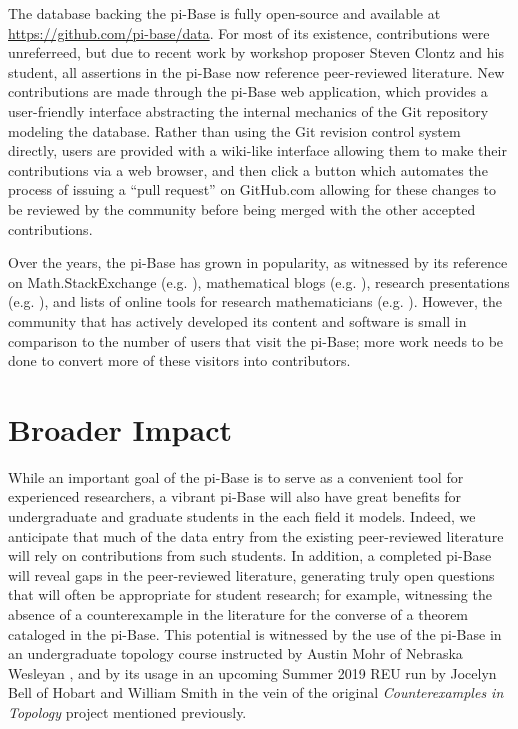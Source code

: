 \documentclass{amsart}
\begin{document}
The database backing the pi-Base is fully open-source and available
at \url{https://github.com/pi-base/data}.
For most of its existence, contributions were
unreferreed, but due to recent work by workshop proposer Steven Clontz
and his student,
all assertions in the pi-Base now reference peer-reviewed literature.
New contributions are made through the pi-Base web application, 
which provides a user-friendly interface abstracting the internal
mechanics of the Git repository modeling the database.
Rather than using the Git revision control system directly, users
are provided with a wiki-like interface allowing them to make their
contributions via a web browser, and then click a button which automates 
the process of issuing a ``pull request''
on GitHub.com allowing for these changes to be reviewed by the community
before being merged with the other accepted contributions.

Over the years, the pi-Base has grown in popularity,
as witnessed by its reference on Math.StackExchange 
(e.g. \cite{157918}), mathematical blogs (e.g. \cite{lamb_2018}),
research presentations (e.g. \cite{clontzPiBase}),
and lists of online tools for research mathematicians 
(e.g. \cite{scheepersPiBase}). However, the community that has
actively developed its content and software is small in comparison
to the number of users that visit the pi-Base; more work needs to be
done to convert more of these visitors into contributors. 

\section{Broader Impact}

While an important goal of the pi-Base is to serve as a convenient
tool for experienced researchers, 
a vibrant pi-Base will also have great benefits for 
undergraduate and graduate students in the each field it models.
Indeed, we anticipate that much of the
data entry from the existing peer-reviewed literature
will rely on contributions from such students.
In addition, a completed pi-Base
will reveal gaps in the peer-reviewed literature, generating truly
open questions that will often be appropriate for student research;
for example, witnessing the absence of a counterexample in the literature
for the converse of a theorem cataloged in the pi-Base.
This potential is witnessed by the use of the pi-Base in an undergraduate
topology course instructed by Austin Mohr of Nebraska Wesleyan \cite{mohrPiBase}, 
and by its usage in an upcoming Summer 2019 REU run by Jocelyn Bell of
Hobart and William Smith in the vein of the original
\textit{Counterexamples in Topology} project mentioned previously.
\end{document}
